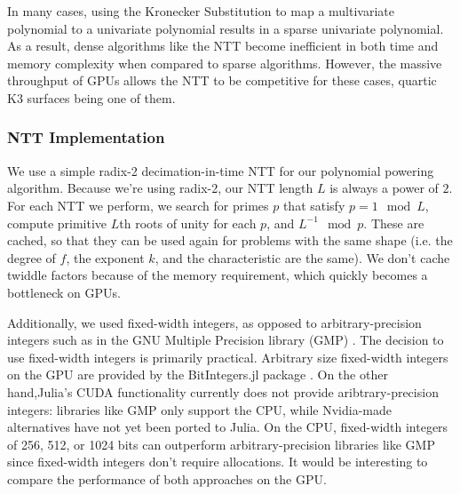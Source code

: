 In many cases, using the Kronecker Substitution to map a multivariate polynomial to a univariate polynomial results in 
a sparse univariate polynomial. As a result, dense algorithms like the NTT become inefficient in both time and memory complexity when compared to sparse algorithms.
However, the massive throughput of GPUs allows the NTT to be competitive for these cases, 
quartic K3 surfaces being one of them.

\subsubsection{NTT Implementation}

We use a simple radix-2 decimation-in-time NTT for our polynomial powering algorithm. Because we're using radix-2, our 
NTT length $L$ is always a power of $2$. 
For each NTT we perform, we search for primes $p$ that satisfy $p = 1 \mod L$, compute primitive $L$th roots of unity for each $p$, and $L^{-1} \mod p$. 
These are cached, so that they can be used again for problems with the same shape 
(i.e. the degree of \(f\), the exponent \(k\), and the characteristic are the same).
We don't cache twiddle factors because of the memory requirement, which quickly
becomes a bottleneck on GPUs.



Additionally, we used fixed-width integers, as opposed to arbitrary-precision integers 
such as in the GNU Multiple Precision library (GMP) \cite{gnu-2024-gmp}. The decision
to use fixed-width integers is primarily practical. 
Arbitrary size fixed-width integers
on the GPU are provided by the BitIntegers.jl package 
\cite{fourquet-2024-bitintegers-jl}.
On the other hand,Julia's CUDA functionality currently does not provide
aribtrary-precision integers:
libraries like GMP only support the CPU, while 
Nvidia-made alternatives have not yet been ported to Julia.
On the CPU, fixed-width integers of 256, 512, or 1024 bits
can outperform arbitrary-precision libraries like GMP 
since fixed-width integers don't require allocations.
It would be interesting to compare the performance of both
approaches on the GPU.


